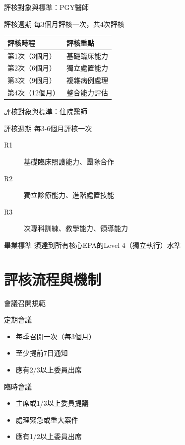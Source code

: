 \documentclass[aspectratio=169,12pt]{beamer}
\begin{document}
\begin{frame}{評核對象與標準：PGY醫師}
\begin{block}{評核週期}
每3個月評核一次，共4次評核
\end{block}

\begin{table}
\footnotesize
\begin{tabular}{ll}
\toprule
\textbf{評核時程} & \textbf{評核重點} \\
\midrule
第1次（3個月） & 基礎臨床能力 \\
第2次（6個月） & 獨立處置能力 \\
第3次（9個月） & 複雜病例處理 \\
第4次（12個月） & 整合能力評估 \\
\bottomrule
\end{tabular}
\end{table}
\end{frame}

\begin{frame}{評核對象與標準：住院醫師}
\begin{block}{評核週期}
每3-6個月評核一次
\end{block}

\begin{description}
    \item[R1] 基礎臨床照護能力、團隊合作
    \item[R2] 獨立診療能力、進階處置技能
    \item[R3] 次專科訓練、教學能力、領導能力
\end{description}

\vspace{0.5em}
\begin{alertblock}{畢業標準}
須達到所有核心EPA的Level 4（獨立執行）水準
\end{alertblock}
\end{frame}

\section{評核流程與機制}

\begin{frame}{會議召開規範}
\begin{block}{定期會議}
\begin{itemize}
    \item 每季召開一次（每3個月）
    \item 至少提前7日通知
    \item 應有2/3以上委員出席
\end{itemize}
\end{block}

\begin{block}{臨時會議}
\begin{itemize}
    \item 主席或1/3以上委員提議
    \item 處理緊急或重大案件
    \item 應有1/2以上委員出席
\end{itemize}
\end{block}
\end{frame}
\end{document}
